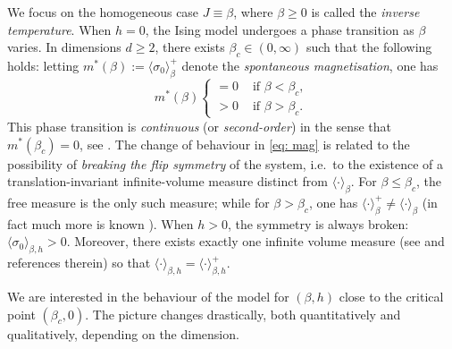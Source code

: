 \documentclass[10pt,a4paper]{amsart}
\numberwithin{equation}{section}
\begin{document}
We focus on the homogeneous case $J\equiv \beta$, where $\beta\geq 0$ is called the \emph{inverse temperature}. When $h=0$, the Ising model undergoes a phase transition as $\beta$ varies. In dimensions $d\geq 2$, there exists $\beta_c\in (0,\infty)$ \cite{PeierlsIsing1936} such that the following holds: letting $m^*(\beta):=\langle \sigma_0\rangle_{\beta}^+$ denote the \emph{spontaneous magnetisation}, one has
\begin{equation}\label{eq: mag}
	m^*(\beta)\begin{cases}\displaystyle=0 &\text{ if }\beta<\beta_c,\\
    \displaystyle>0&\text{ if }\beta>\beta_c.\end{cases}
\end{equation}
This phase transition is \emph{continuous} (or \emph{second-order}) in the sense that $m^*(\beta_c)=0$, see \cite{Yang1952spontaneous,AizenmanFernandezCriticalBehaviorMagnetization1986,WernerPercolationEtModeledIsing2009,AizenmanDuminilSidoraviciusContinuityIsing2015}. The change of behaviour in \eqref{eq: mag} is related to the possibility of \emph{breaking the flip symmetry} of the system, i.e.~to the existence of a translation-invariant infinite-volume measure distinct from $\langle \cdot \rangle_{\beta}$. For $\beta\leq \beta_c$, the free measure is the only such measure; while for $\beta>\beta_c$, one has $\langle \cdot\rangle_{\beta}^+\neq \langle \cdot\rangle_{\beta}$ (in fact much more is known \cite{BodineauTranslationGibbsIsing2006,RaoufiGibbsMeasures}). When $h>0$, the symmetry is always broken: $\langle \sigma_0\rangle_{\beta,h}>0$. Moreover, there exists exactly one infinite volume measure (see \cite{FriedliVelenikIntroStatMech2017} and references therein) so that $\langle \cdot\rangle_{\beta,h}=\langle \cdot\rangle_{\beta,h}^+$. 

\vspace{4pt}

We are interested in the behaviour of the model for $(\beta,h)$ close to 
the critical point $(\beta_c,0)$. The picture changes drastically, both quantitatively and qualitatively, depending on the dimension.
\end{document}
